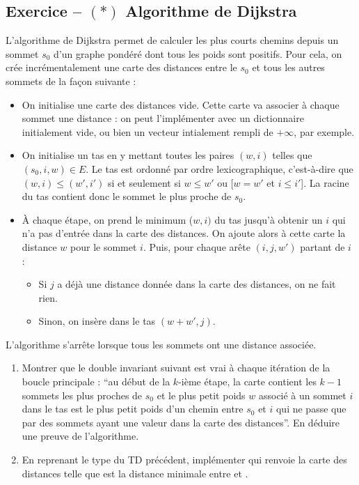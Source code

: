 \documentclass{article}
\newcounter{loop}
\newcounter{numEx}
\newcommand{\exo}[1]{
	\stepcounter{numEx}
	\setcounter{loop}{0}
	\subsection*{Exercice \arabic{numEx} -- #1}
}
\begin{document}
\exo{$(*)$ Algorithme de Dijkstra}

L'algorithme de Dijkstra permet de calculer les plus courts chemins depuis un sommet $s_0$ d'un graphe pondéré dont tous les poids sont positifs. Pour cela, on crée incrémentalement une carte des distances entre le $s_0$ et tous les autres sommets de la façon suivante :
\begin{itemize}
	\item On initialise une carte des distances vide. Cette carte va associer à chaque sommet une distance : on peut l'implémenter avec un dictionnaire initialement vide, ou bien un vecteur intialement rempli de $+\infty$, par exemple.
	\item On initialise un tas en y mettant toutes les paires $(w, i)$ telles que $(s_0, i, w)\in E$. Le tas est ordonné par ordre lexicographique, c'est-à-dire que $(w, i) \le (w', i')$ si et seulement si $w \le w'$ ou [$w = w'$ et $i \le i'$]. La racine du tas contient donc le sommet le plus proche de $s_0$.
	\item À chaque étape, on prend le minimum ($w, i)$ du tas jusqu'à obtenir un $i$ qui n'a pas d'entrée dans la carte des distances. On ajoute alors à cette carte la distance $w$ pour le sommet $i$. Puis, pour chaque arête $(i, j, w')$ partant de $i$ :
	\begin{itemize}
		\item Si $j$ a déjà une distance donnée dans la carte des distances, on ne fait rien.
		\item Sinon, on insère dans le tas $(w + w', j)$.
	\end{itemize}
\end{itemize}
L'algorithme s'arrête lorsque tous les sommets ont une distance associée.

\begin{enumerate}
	\item Montrer que le double invariant suivant est vrai à chaque itération de la boucle principale : ``au début de la $k$-ième étape, la carte contient les $k-1$ sommets les plus proches de $s_0$ et le plus petit poids $w$ associé à un sommet $i$ dans le tas est le plus petit poids d'un chemin entre $s_0$ et $i$ qui ne passe que par des sommets ayant une valeur dans la carte des distances''. En déduire une preuve de l'algorithme.
	
	\item En reprenant le type  du TD précédent, implémenter  qui renvoie la carte des distances  telle que  est la distance minimale entre  et .
\end{enumerate}
	
\end{document}
